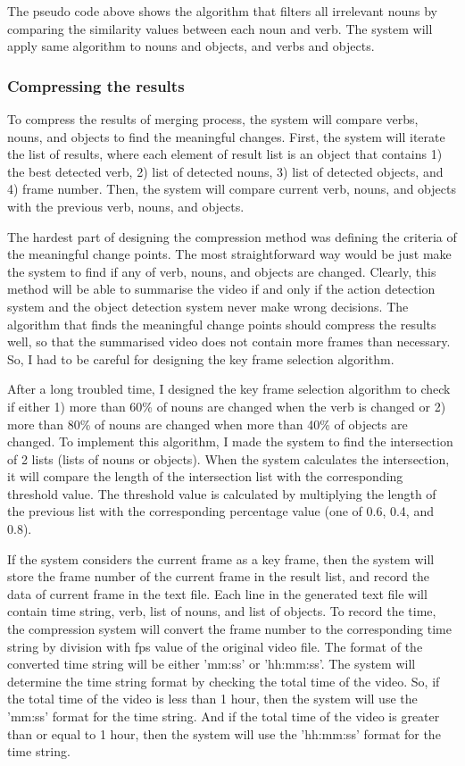 \documentclass{article}
\begin{document}
The pseudo code above shows the algorithm that filters all irrelevant nouns by comparing the similarity values between each noun and verb. The system will apply same algorithm to nouns and objects, and verbs and objects.

\subsubsection{Compressing the results}

To compress the results of merging process, the system will compare verbs, nouns, and objects to find the meaningful changes. First, the system will iterate the list of results, where each element of result list is an object that contains 1) the best detected verb, 2) list of detected nouns, 3) list of detected objects, and 4) frame number. Then, the system will compare current verb, nouns, and objects with the previous verb, nouns, and objects.

The hardest part of designing the compression method was defining the criteria of the meaningful change points. The most straightforward way would be just make the system to find if any of verb, nouns, and objects are changed. Clearly, this method will be able to summarise the video if and only if the action detection system and the object detection system never make wrong decisions. The algorithm that finds the meaningful change points should compress the results well, so that the summarised video does not contain more frames than necessary. So, I had to be careful for designing the key frame selection algorithm.

After a long troubled time, I designed the key frame selection algorithm to check if either 1) more than 60\% of nouns are changed when the verb is changed or 2) more than 80\% of nouns are changed when more than 40\% of objects are changed. To implement this algorithm, I made the system to find the intersection of 2 lists (lists of nouns or objects). When the system calculates the intersection, it will compare the length of the intersection list with the corresponding threshold value. The threshold value is calculated by multiplying the length of the previous list with the corresponding percentage value (one of 0.6, 0.4, and 0.8).

If the system considers the current frame as a key frame, then the system will store the frame number of the current frame in the result list, and record the data of current frame in the text file. Each line in the generated text file will contain time string, verb, list of nouns, and list of objects. To record the time, the compression system will convert the frame number to the corresponding time string by division with fps value of the original video file. The format of the converted time string will be either 'mm:ss' or 'hh:mm:ss'. The system will determine the time string format by checking the total time of the video. So, if the total time of the video is less than 1 hour, then the system will use the 'mm:ss' format for the time string. And if the total time of the video is greater than or equal to 1 hour, then the system will use the 'hh:mm:ss' format for the time string.
\end{document}
